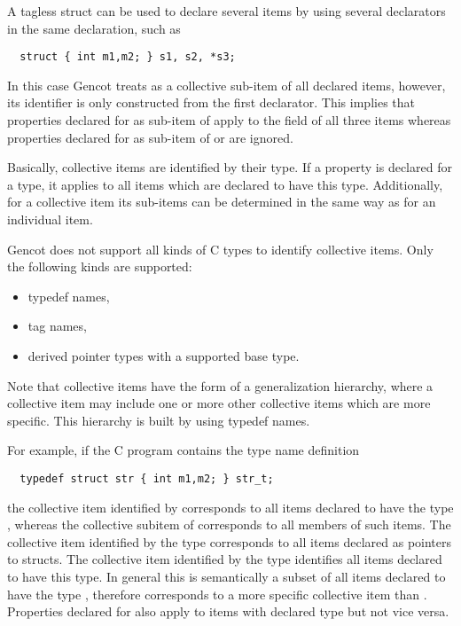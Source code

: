 A tagless struct can be used to declare several items by using several declarators in the same declaration, such as
\begin{verbatim}
  struct { int m1,m2; } s1, s2, *s3;
\end{verbatim}
In this case Gencot treats  as a collective sub-item of all declared items, however, its identifier is
only constructed from the first declarator. This implies that properties declared for  as sub-item
of  apply to the field of all three items whereas properties declared for  as sub-item of 
 or  are ignored. 

Basically, collective items are identified by their type. If a property is declared for a type, it applies to 
all items which are declared to have this type. Additionally, for a collective item its sub-items can be determined
in the same way as for an individual item. 

Gencot does not support all kinds of C types to identify collective items. Only the following kinds are supported:
\begin{itemize}
\item typedef names,
\item tag names,
\item derived pointer types with a supported base type.
\end{itemize}
Note that collective items have the form of a generalization hierarchy, where a collective item may include one or 
more other collective items which are more specific. This hierarchy is built by using typedef names.

For example, if the C program contains the type name definition 
\begin{verbatim}
  typedef struct str { int m1,m2; } str_t;
\end{verbatim}
the collective item identified by  corresponds to all items declared to have the type ,
whereas the collective subitem  of  corresponds to all members  of such items. The collective
item identified by the type  corresponds to all items declared as pointers to  structs.
The collective item identified by the type  identifies all items declared to have this type. In general 
this is semantically a subset of all items declared to have the type , therefore  corresponds
to a more specific collective item than . Properties declared for  also apply to items
with declared type  but not vice versa.

